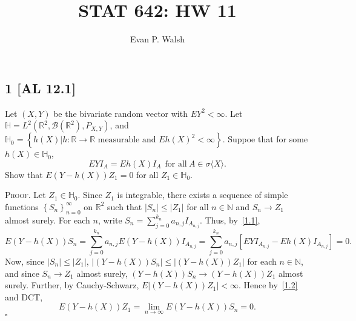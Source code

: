 \documentclass[12pt]{article}
\title{STAT 642: HW 11}
\author{Evan P. Walsh}
\newcounter{ProofCounter}
\newenvironment{Proof}{\stepcounter{ProofCounter}\textsc{Proof.}}{\hfill$\square$}
\begin{document}
\subsection*{1 [AL 12.1]}
\begin{tcolorbox}
  Let $(X,Y)$ be the bivariate random vector with $EY^{2} < \infty$. Let $\mathbb{H} = L^{2}(\mathbb{R}^{2}, \mathcal{B}(\mathbb{R}^{2}), P_{X,Y})$,
  and $\mathbb{H}_{0} = \left\{ h(X) | h : \mathbb{R} \rightarrow \mathbb{R}\text{ measurable and }Eh(X)^{2} < \infty \right\}$. Suppoe that for some
  $h(X) \in \mathbb{H}_{0}$, 
  \begin{equation}
    EYI_{A} = Eh(X)I_{A}\ \ \text{for all}\ A \in \sigma\langle X\rangle. 
    \label{1.1}
  \end{equation}
  Show that $E(Y - h(X))Z_1 = 0$ for all $Z_1 \in
  \mathbb{H}_{0}$. 
\end{tcolorbox}
\begin{Proof}
  Let $Z_1 \in \mathbb{H}_{0}$. Since $Z_1$ is integrable, there exists a sequence of simple functions $\left\{S_n\right\}_{n=0}^{\infty}$ 
  on $\mathbb{R}^{2}$ such that $|S_n| \leq |Z_1|$ for all $n \in \mathbb{N}$ and $S_n \rightarrow Z_{1}$ almost surely. For each $n$, write $S_n = \sum_{j=0}^{k_n}a_{n,j}I_{A_{n,j}}$.
  Thus, by~\eqref{1.1},
  \begin{equation}
    E(Y - h(X))S_n = \sum_{j=0}^{k_n}a_{n,j}E(Y - h(X))I_{A_{n,j}} = \sum_{j=0}^{k_n}a_{n,j}[EYI_{A_{n,j}} - Eh(X)I_{A_{n,j}}] = 0.
    \label{1.2}
  \end{equation}
  Now, since $|S_n| \leq |Z_1|$, $|(Y - h(X))S_n| \leq |(Y - h(X))Z_1|$ for each $n \in \mathbb{N}$, and since $S_n \rightarrow Z_1$ almost surely,
  $(Y - h(X))S_n \rightarrow (Y - h(X))Z_1$ almost surely. Further, 
  by Cauchy-Schwarz, $E|(Y - h(X))Z_1| < \infty$. Hence by~\eqref{1.2} and DCT,
  \[ E(Y - h(X))Z_1 = \lim_{n\rightarrow\infty}E(Y - h(X))S_n = 0. \]
\end{Proof}
\end{document}
